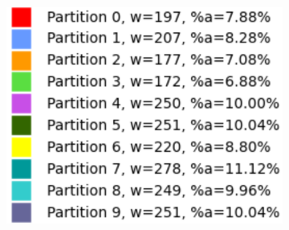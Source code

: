 \begin{figure}[h]
\centering
\begin{subfigure}{.33\textwidth}
    \centering
    \caption[short]{}
\end{subfigure}%
\begin{subfigure}{.33\textwidth}
    \centering
    \caption[short]{}
\end{subfigure}%
\begin{subfigure}{.33\textwidth}
    \centering
    \includegraphics[width=0.9\linewidth]{images/results/m_k/with/12/results}

\end{subfigure}
\end{figure}
